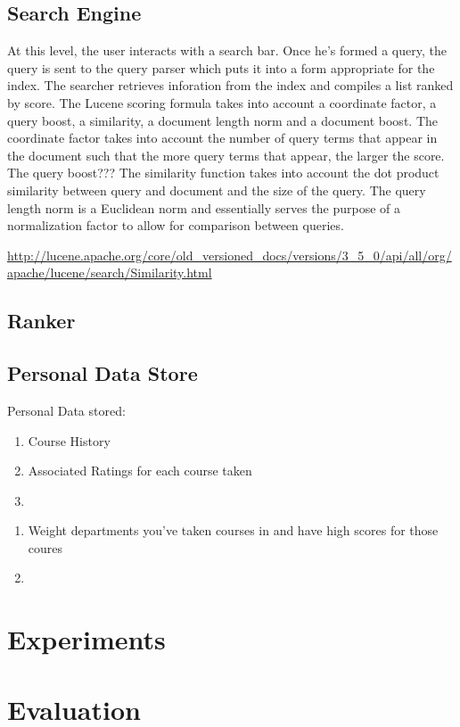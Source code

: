 \documentclass[12pt,letterpaper]{article}
\begin{document}
	\subsection{Search Engine}
		At this level, the user interacts with a search bar. Once he's formed a query, the query is sent to the query parser which puts it into a form appropriate for the index. The searcher retrieves inforation from the index and compiles a list ranked by score. The Lucene scoring formula takes into account a coordinate factor, a query boost, a similarity, a document length norm and a document boost. 
		The coordinate factor takes into account the number of query terms that appear in the document such that the more query terms that appear, the larger the score. 
		The query boost???
		The similarity function takes into account the dot product similarity between query and document and the size of the query. The query length norm is a Euclidean norm and essentially serves the purpose of a normalization factor to allow for comparison between queries.
				
		\url{http://lucene.apache.org/core/old_versioned_docs/versions/3_5_0/api/all/org/apache/lucene/search/Similarity.html}
		
	\subsection{Ranker}
	\subsection{Personal Data Store}
	Personal Data stored:
		\begin{enumerate}
			\item Course History
			\item Associated Ratings for each course taken
			\item 
		\end{enumerate}
	
		\begin{enumerate}
			\item Weight departments you've taken courses in and have high scores for those coures
			\item 
		\end{enumerate}
\section{Experiments}

\section{Evaluation}
\end{document}
